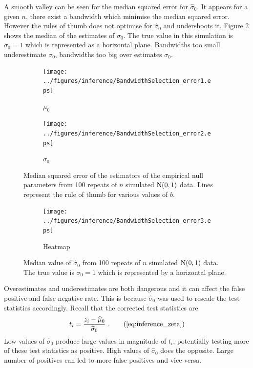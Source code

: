 A smooth valley can be seen for the median squared error for $\widehat{\sigma}_0$. It appears for a given $n$, there exist a bandwidth which minimise the median squared error. However the rules of thumb does not optimise for $\widehat{\sigma}_0$ and undershoots it. Figure \ref{fig:inference_BandwidthSelection_error3} shows the median of the estimates of $\sigma_0$. The true value in this simulation is $\sigma_0=1$ which is represented as a horizontal plane. Bandwidths too small underestimate $\sigma_0$, bandwidths too big over estimates $\sigma_0$.

\begin{figure}
  \centering
  \begin{subfigure}[b]{0.49\textwidth}
      \texttt{[image: ../figures/inference/BandwidthSelection\_error1.eps]}
      \caption{$\mu_0$}
  \end{subfigure}
  \begin{subfigure}[b]{0.49\textwidth}
      \texttt{[image: ../figures/inference/BandwidthSelection\_error2.eps]}
      \caption{$\sigma_0$}
  \end{subfigure}
  \caption{Median squared error of the estimators of the empirical null parameters from 100 repeats of $n$ simulated $\operatorname{N}(0,1)$ data. Lines represent the rule of thumb for various values of $b$.}
  \label{fig:inference_BandwidthSelection_error}
\end{figure}

\begin{figure}
  \centering
    \begin{subfigure}[b]{0.49\textwidth}
        \texttt{[image: ../figures/inference/BandwidthSelection\_error3.eps]}
        \caption{Heatmap}
    \end{subfigure}
    \caption{Median value of $\widehat{\sigma}_0$ from 100 repeats of $n$ simulated $\operatorname{N}(0,1)$ data. The true value is $\sigma_0=1$ which is represented by a horizontal plane.}
    \label{fig:inference_BandwidthSelection_error3}
\end{figure}

Overestimates and underestimates are both dangerous and it can affect the false positive and false negative rate. This is because $\widehat{\sigma}_0$ was used to rescale the test statistics accordingly. Recall that the corrected test statistics are
\begin{equation}
  t_i = \dfrac{
    z_i - \widehat{\mu}_0
  }
  {
    \widehat{\sigma}_0
  }
  \ .
  \tag{\ref{eq:inference_zeta}}
\end{equation}
Low values of $\widehat{\sigma}_0$ produce large values in magnitude of $t_i$, potentially testing more of these test statistics as positive. High values of $\widehat{\sigma}_0$ does the opposite. Large number of positives can led to more false positives and vice versa.

